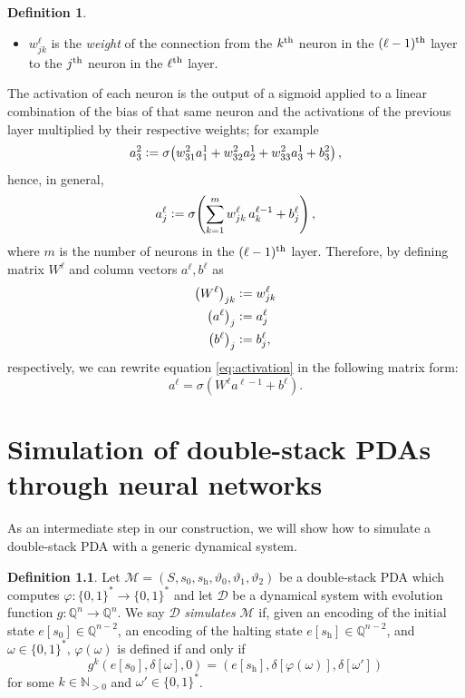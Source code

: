 \documentclass{book}
\newcommand{\defeq}{\vcentcolon=}
\newcommand{\Q}{\mathbb{Q}}
\newcommand{\h}{\mathrm{h}}
\theoremstyle{definition}
\newtheorem{definition}{Definition}[chapter]
\theoremstyle{plain}
\theoremstyle{plain}
\theoremstyle{remark}
\theoremstyle{plain}
\begin{document}
\begin{definition}
\begin{itemize}
			\item $w_{jk}^\ell$ is the \emph{weight} of the connection from the $k\textsuperscript{th}$ neuron in the $(\ell-1)\textsuperscript{th}$ layer to the $j\textsuperscript{th}$ neuron in the $\ell\textsuperscript{th}$ layer.
		\end{itemize}
		The activation of each neuron is the output of a sigmoid applied to a linear combination of the bias of that same neuron and the activations of the previous layer multiplied by their respective weights; for example
		$$
			a_3^2\defeq\sigma\!\left(w_{31}^2a_1^1+w_{32}^2a_2^1+w_{33}^2a_3^1+b_3^2\right),
		$$
		hence, in general,
		\begin{equation} \label{eq:activation}
			a_j^\ell\defeq\sigma\!\left(\sum_{k=1}^{m}w_{jk}^\ell\,a_k^{\ell-1}+b_j^\ell \right),
		\end{equation}
		where $m$ is the number of neurons in the $(\ell-1)\textsuperscript{th}$ layer. Therefore, by defining matrix $W^\ell$ and column vectors $a^\ell,b^\ell$ as 
		\begin{align*}
			\left(W^\ell\right)_{jk} &\defeq w_{jk}^\ell \\
			\left(a^\ell\right)_j    &\defeq a_j^\ell \\
			\left(b^\ell\right)_j	 &\defeq b_j^\ell,
		\end{align*}
		respectively, we can rewrite equation \ref{eq:activation} in the following matrix form:
		$$
			a^\ell=\sigma\!\left(W^\ell a^{\ell-1}+b^\ell\right).
		$$
	\end{definition}
	

	\chapter{Simulation of double-stack PDAs through neural networks}  \label{chap:simulation}
	As an intermediate step in our construction, we will show how to simulate a double-stack PDA with a generic dynamical system.
	\begin{definition}
		Let $\mathcal{M}=(S,s_0,s_\h,\vartheta_0,\vartheta_1,\vartheta_2)$ be a double-stack PDA which computes $\varphi:\{0,1\}^* \to \{0,1\}^*$ and let $\mathcal{D}$ be a dynamical system with evolution function $g:\Q^n\to\Q^n$. We say $\mathcal{D}$ \emph{simulates} $\mathcal{M}$ if, given an encoding of the initial state $e[s_0]\in\Q^{n-2}$, an encoding of the halting state $e[s_\h]\in\Q^{n-2}$, and $\omega\in\{0,1\}^*$, $\varphi(\omega)$ is defined if and only if
		$$
			g^k(e[s_0],\delta[\omega],0)=(e[s_\h],\delta[\varphi(\omega)],\delta[\omega'])
		$$ 
		for some $k\in\mathbb{N}_{>0}$ and $\omega'\in\{0,1\}^*$.
	\end{definition}
	
\end{document}
